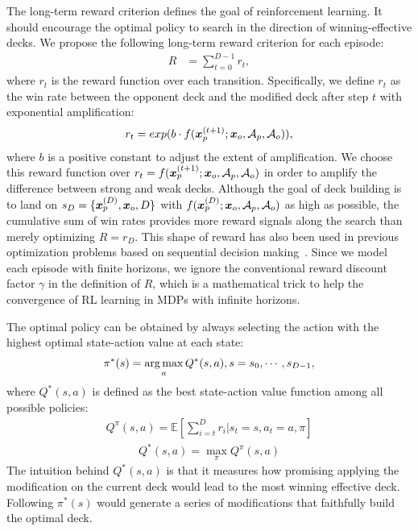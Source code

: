 The long-term reward criterion defines the goal of reinforcement learning. It should encourage the optimal policy to search in the direction of winning-effective decks. We propose the following long-term reward criterion for each episode:
\begin{align}
R &=\sum_{t=0}^{D-1} r_t,
\end{align}
where $r_t$ is the reward function over each transition. Specifically, we define $r_t$ as the win rate between the opponent deck and the modified deck after step $t$ with exponential amplification:
\begin{align}
    r_t=exp(b \cdot f(\boldsymbol{x}^{(t+1)}_p; \boldsymbol{x}_o, \mathcal{A}_p, \mathcal{A}_o)),
\end{align}
where $b$ is a positive constant to adjust the extent of amplification. We choose this reward function over $r_t=f(\boldsymbol{x}^{(t+1)}_p; \boldsymbol{x}_o, \mathcal{A}_p, \mathcal{A}_o)$ in order to amplify the difference between strong and weak decks. Although the goal of deck building is to land on ${s_D=\{\boldsymbol{x}_p^{(D)}, \boldsymbol{x}_o, D\}}$ with $f(\boldsymbol{x}_p^{(D)}; \boldsymbol{x}_o, \mathcal{A}_p, \mathcal{A}_o)$ as high as possible, the cumulative sum of win rates provides more reward signals along the search than merely optimizing ${R=r_D}$. This shape of reward has also been used in previous optimization problems based on sequential decision making~\cite{andrychowicz2016learning,chenlearning}. Since we model each episode with finite horizons, we ignore the conventional reward discount factor $\gamma$ in the definition of $R$, which is a mathematical trick to help the convergence of RL learning in MDPs with infinite horizons. 

The optimal policy can be obtained by always selecting the action with the highest optimal state-action value at each state:
\begin{align}
    \pi^*(s) = \operatorname*{arg\,max}_a Q^*(s,a),  s = s_0, \cdots, s_{D-1},
\label{eqn:optpolicy}
\end{align}
where $Q^*(s,a)$ is defined as the best state-action value function among all possible policies:
\begin{align}
Q^\pi(s,a)=\mathbb{E}[\sum_{i=t}^{D} r_i | s_t=s, a_t=a, \pi] 
\end{align}
\begin{align}
Q^*(s,a)=\max_\pi Q^\pi(s,a) 
\end{align}
The intuition behind $Q^*(s,a)$ is that it measures how promising applying the modification on the current deck would lead to the most winning effective deck. Following $\pi^*(s)$ would generate a series of modifications that faithfully build the optimal deck. 


